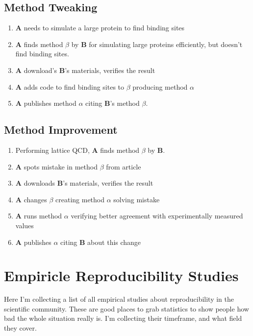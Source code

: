 \documentclass[american]{article}
\begin{document}
\subsection{Method Tweaking}

\begin{enumerate}
\item \textbf{A} needs to simulate a large protein to find binding sites
\item \textbf{A} finds method \boldmath$\beta$ by \textbf{B} for simulating large proteins efficiently, but doesn't find binding sites.
\item \textbf{A} download's \textbf{B}'s materials, verifies the result
\item \textbf{A} adds code to find binding sites to $\beta$ producing method $\alpha$
\item \textbf{A} publishes method $\alpha$ citing \textbf{B}'s method $\beta$.
\end{enumerate}

\subsection{Method Improvement}

\begin{enumerate}
\item Performing lattice QCD, \textbf{A} finds method \boldmath$\beta$ by \textbf{B}.
\item \textbf{A} spots mistake in method $\beta$ from article
\item \textbf{A} downloads \textbf{B}'s materials, verifies the result
\item \textbf{A} changes $\beta$ creating method $\alpha$ solving mistake
\item \textbf{A} runs method $\alpha$ verifying better agreement with experimentally measured values
\item \textbf{A} publishes $\alpha$ citing \textbf{B} about this change
\end{enumerate}

\section{Empiricle Reproducibility Studies}

Here I'm collecting a list of all empirical studies about reproducibility in the scientific community. These are good places to grab statistics to show people how bad the whole situation really is. I'm collecting their timeframe, and what field they cover.
\end{document}
